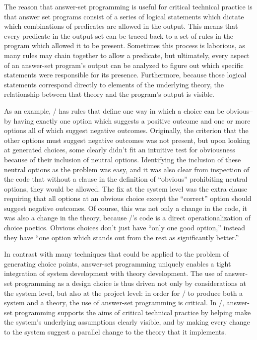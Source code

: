 The reason that answer-set programming is useful for critical technical practice is that answer set programs consist of a series of logical statements which dictate which combinations of predicates are allowed in the output.
%
This means that every predicate in the output set can be traced back to a set of rules in the program which allowed it to be present.
%
Sometimes this process is laborious, as many rules may chain together to allow a predicate, but  ultimately, every aspect of an answer-set program's output can be analyzed to figure out which specific statements were responsible for its presence.
%
Furthermore, because those logical statements correspond directly to elements of the underlying theory, the relationship between that theory and the program's output is visible.

As an example, \dunyazad/ has rules that define one way in which a choice can be obvious--by having exactly one option which suggests a positive outcome and one or more options all of which suggest negative outcomes.
%
Originally, the criterion that the other options must suggest negative outcomes was not present, but upon looking at generated choices, some clearly didn't fit an intuitive test for obviousness because of their inclusion of neutral options.
%
Identifying the inclusion of these neutral options as the problem was easy, and it was also clear from inspection of the code that without a clause in the definition of ``obvious'' prohibiting neutral options, they would be allowed.
%
The fix at the system level was the extra clause requiring that all options at an obvious choice except the ``correct'' option should suggest negative outcomes.
%
Of course, this was not only a change in the code, it was also a change in the theory, because \dunyazad/'s code is a direct operationalization of choice poetics.
%
Obvious choices don't just have ``only one good option,'' instead they have ``one option which stands out from the rest as significantly better.''


In contrast with many techniques that could be applied to the problem of generating choice points, answer-set programming uniquely enables a tight integration of system development with theory development.
%
The use of answer-set programming as a design choice is thus driven not only by considerations at the system level, but also at the project level: in order for \dunyazad/ to produce both a system and a theory, the use of answer-set programming is critical.
%
In \dunyazad/, answer-set programming supports the aims of critical technical practice by helping make the system's underlying assumptions clearly visible, and by making every change to the system suggest a parallel change to the theory that it implements.

